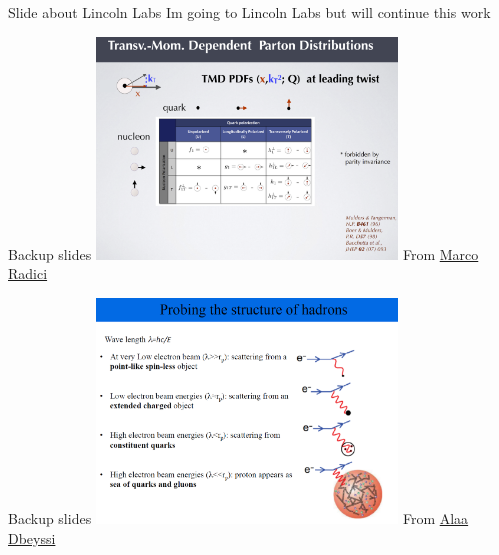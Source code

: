 \documentclass[aspectratio=169]{beamer}
\begin{document}
\begin{frame}{Slide about Lincoln Labs}
Im going to Lincoln Labs but will continue this work
\end{frame}



\begin{frame}{Backup slides}
\centering
\includegraphics[width=0.6\textwidth]{backup/tmd_lead_twist.png}
From \href{https://indico.cern.ch/event/797767/contributions/3682622/attachments/1965784/3268756/6_radici.pdf}{Marco Radici}
\end{frame}

\begin{frame}{Backup slides}
\centering
\includegraphics[width=0.6\textwidth]{backup/scale_walkdown.png}
From \href{https://indico.gsi.de/event/6430/sessions/4600/attachments/21407/26971/AD_NucleonStructure2.pdf}{Alaa Dbeyssi}
\end{frame}
\end{document}
